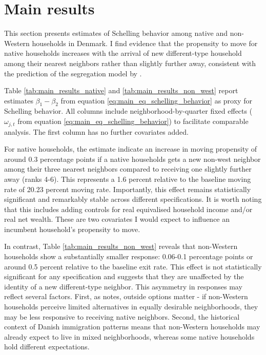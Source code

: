 \documentclass[../main.tex]{subfiles}
\begin{document}
\section{Main results}
\label{sec:results}

This section presents estimates of Schelling behavior among native and non-Western households in Denmark. I find evidence that the propensity to move for native households increases with the arrival of new different-type household among their nearest neighbors rather than slightly further away, consistent with the prediction of the segregation model by \textcite{schelling1971dynamic}. 

Table \ref{tab:main_results_native} and \ref{tab:main_results_non_west} report estimates $\beta_1-\beta_2$ from equation \ref{eq:main_eq_schelling_behavior} as proxy for Schelling behavior. All columns include neighborhood-by-quarter fixed effects ($\omega_{j,t}$ from equation \ref{eq:main_eq_schelling_behavior}) to facilitate comparable analysis. The first column has no further covariates added. 

For native households, the estimate indicate an increase in moving propensity of around 0.3 percentage points if a native households gets a new non-west neighbor among their three nearest neighbors compared to receiving one slightly further away (ranks 4-6). This represents a 1.6 percent relative to the baseline moving rate of 20.23 percent moving rate. Importantly, this effect remains statistically significant and remarkably stable across different specifications. It is worth noting that this includes adding controls for real equivalised household income and/or real net wealth. These are two covariates I would expect to influence an incumbent household's propensity to move.  

In contrast, Table \ref{tab:main_results_non_west} reveals that non-Western households show a substantially smaller response: 0.06-0.1 percentage points or around 0.5 percent relative to the baseline exit rate. This effect is not statistically significant for any specification and suggests that they are unaffected by the identity of a new different-type neighbor. This asymmetry in responses may reflect several factors. First, as \textcite{blair2017outside} notes, outside options matter - if non-Western households perceive limited alternatives in equally desirable neighborhoods, they may be less responsive to receiving native neighbors. Second, the historical context of Danish immigration patterns means that non-Western households may already expect to live in mixed neighborhoods, whereas some native households hold different expectations. 
\end{document}
